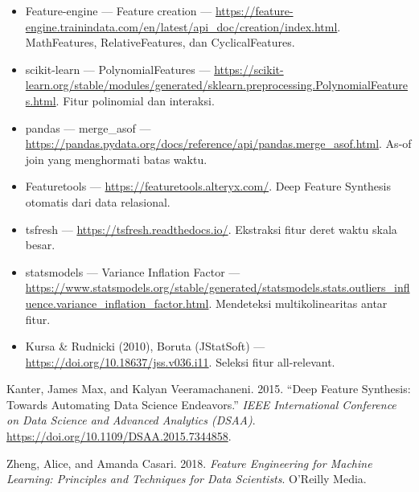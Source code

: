 \begin{bacaan}

\begin{itemize}
\tightlist
\item
  Feature-engine --- Feature creation --- \url{https://feature-engine.trainindata.com/en/latest/api_doc/creation/index.html}. MathFeatures, RelativeFeatures, dan CyclicalFeatures.
\item
  scikit-learn --- PolynomialFeatures --- \url{https://scikit-learn.org/stable/modules/generated/sklearn.preprocessing.PolynomialFeatures.html}. Fitur polinomial dan interaksi.
\item
  pandas --- merge\_asof --- \url{https://pandas.pydata.org/docs/reference/api/pandas.merge_asof.html}. As-of join yang menghormati batas waktu.
\item
  Featuretools --- \url{https://featuretools.alteryx.com/}. Deep Feature Synthesis otomatis dari data relasional.
\item
  tsfresh --- \url{https://tsfresh.readthedocs.io/}. Ekstraksi fitur deret waktu skala besar.
\item
  statsmodels --- Variance Inflation Factor --- \url{https://www.statsmodels.org/stable/generated/statsmodels.stats.outliers_influence.variance_inflation_factor.html}. Mendeteksi multikolinearitas antar fitur.
\item
  Kursa \& Rudnicki (2010), Boruta (JStatSoft) --- \url{https://doi.org/10.18637/jss.v036.i11}. Seleksi fitur all-relevant.
\end{itemize}

\end{bacaan}

\rujukanheading

\protect{}\label{refs}
\begin{CSLReferences}{1}{1}
Kanter, James Max, and Kalyan Veeramachaneni. 2015. {``Deep Feature Synthesis: Towards Automating Data Science Endeavors.''} \emph{IEEE International Conference on Data Science and Advanced Analytics (DSAA)}. \url{https://doi.org/10.1109/DSAA.2015.7344858}.

Zheng, Alice, and Amanda Casari. 2018. \emph{Feature Engineering for Machine Learning: Principles and Techniques for Data Scientists}. O'Reilly Media.

\end{CSLReferences}
